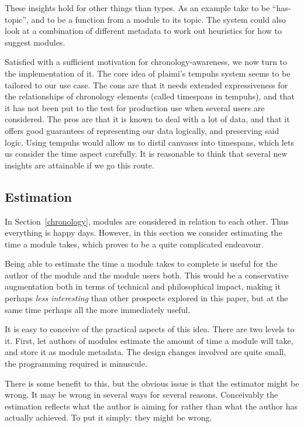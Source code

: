 \documentclass{article}
\begin{document}
\begin{multicols}{2}
These insights hold for other things than types. As an example take  to be 
``has-topic'', and  to be a function from a module to its topic. The system 
could also look at a combination of different metadata to work out heuristics 
for how to suggest modules.

Satisfied with a sufficient motivation for chronology-awareness, we now turn 
to the implementation of it. The core idea of plaimi's tempuhs system seems to 
be tailored to our use case. The cons are that it needs extended 
expressiveness for the relationships of chronology elements (called timespans 
in tempuhs), and that it has not been put to the test for production use when 
several users are considered. The pros are that it is known to deal with a lot 
of data, and that it offers good guarantees of representing our data 
logically, and preserving said logic. Using tempuhs would allow us to distil 
canvases into timespans, which lets us consider the time aspect carefully. It 
is reasonable to think that several new insights are attainable if we go this 
route.
 \subsection{Estimation}
\label{estimation}
In Section~\ref{chronology}, modules are considered in relation to each other. 
Thus everything is happy days. However, in this section we consider estimating 
the time a module takes, which proves to be a quite complicated endeavour.

Being able to estimate the time a module takes to complete is useful for the 
author of the module and the module users both. This would be a conservative 
augmentation both in terms of technical and philosophical impact, making it 
perhaps \emph{less interesting} than other prospects explored in this paper, 
but at the same time perhaps all the more immediately useful.

It is easy to conceive of the practical aspects of this idea. There are two 
levels to it. First, let authors of modules estimate the amount of time a 
module will take, and store it as module metadata. The design changes involved 
are quite small, the programming required is minuscule.

There is some benefit to this, but the obvious issue is that the estimator 
might be wrong. It may be wrong in several ways for several reasons. 
Conceivably the estimation reflects what the author is aiming for rather than 
what the author has actually achieved. To put it simply: they might be wrong.


\end{multicols}
\end{document}
